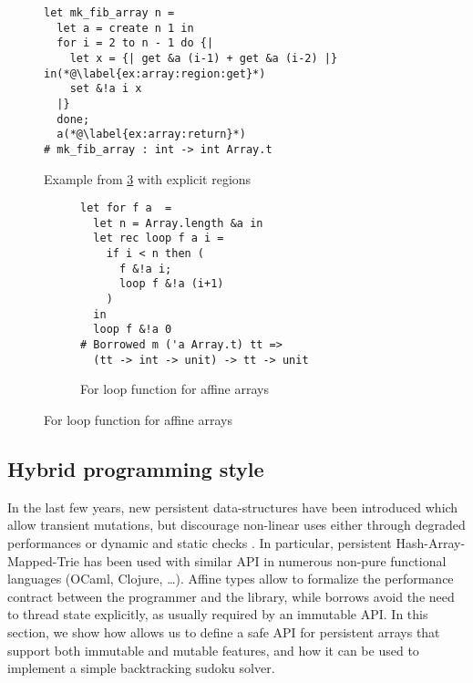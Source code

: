 \begin{figure}
  \centering
\begin{lstlisting}
let mk_fib_array n =
  let a = create n 1 in
  for i = 2 to n - 1 do {|
    let x = {| get &a (i-1) + get &a (i-2) |} in(*@\label{ex:array:region:get}*)
    set &!a i x
  |}
  done;
  a(*@\label{ex:array:return}*)
# mk_fib_array : int -> int Array.t
\end{lstlisting}
    \caption{Example from \cref{ex:array} with explicit regions}
    \label{ex:array:region}
\end{figure}



\begin{figure}
  \centering
  \begin{subfigure}{0.5\linewidth}
\begin{lstlisting}
let for f a  = 
  let n = Array.length &a in
  let rec loop f a i = 
    if i < n then (
      f &!a i;
      loop f &!a (i+1)
    )
  in
  loop f &!a 0
# Borrowed m ('a Array.t) tt =>
  (tt -> int -> unit) -> tt -> unit
\end{lstlisting}
    \caption{For loop function for affine arrays}
    \label{ex:array}
  \end{subfigure}
\end{figure}

\subsection{Hybrid programming style}

In the last few years, new persistent data-structures
have been introduced which allow transient mutations, but discourage
non-linear uses either through degraded performances
\cite{DBLP:conf/ml/ConchonF07} or
dynamic and static checks \cite{DBLP:journals/pacmpl/Puente17}.
In particular, persistent Hash-Array-Mapped-Trie has been used with similar
API in numerous non-pure functional languages (OCaml, Clojure, \dots).
Affine types allow to formalize the performance contract between the programmer
and the library, while borrows avoid the need to thread state explicitly,
as usually required by an immutable API.
%
In this section, we show how \lang allows us to define
a safe API for persistent arrays that support both immutable and mutable features,
and how it can be used to implement a simple backtracking sudoku solver.

